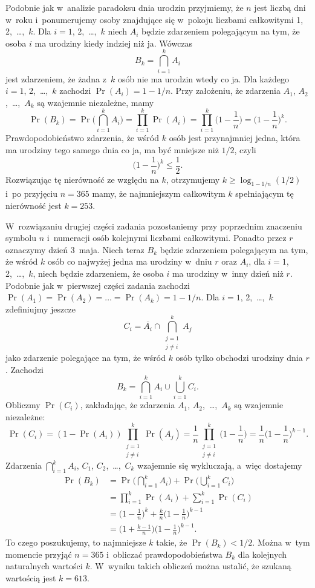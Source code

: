 
\exercise %
Podobnie jak w~analizie paradoksu dnia urodzin przyjmiemy, że $n$ jest liczbą dni w~roku i~ponumerujemy osoby znajdujące się w~pokoju liczbami całkowitymi 1, 2,~\dots,~$k$. Dla $i=1$, 2,~\dots,~$k$ niech $A_i$ będzie zdarzeniem polegającym na tym, że osoba $i$ ma urodziny kiedy indziej niż ja. Wówczas
\[
	B_k = \bigcap_{i=1}^kA_i
\]
jest zdarzeniem, że żadna z~$k$ osób nie ma urodzin wtedy co ja. Dla każdego $i=1$, 2,~\dots,~$k$ zachodzi $\Pr(A_i)=1-1/n$. Przy założeniu, że zdarzenia $A_1$, $A_2$,~\dots,~$A_k$ są wzajemnie niezależne, mamy
\[
	\Pr(B_k) = \Pr\biggl(\bigcap_{i=1}^kA_i\biggr) = \prod_{i=1}^k\Pr(A_i) = \prod_{i=1}^k\biggl(1-\frac{1}{n}\biggr) = \biggl(1-\frac{1}{n}\biggr)^k.
\]
Prawdopodobieństwo zdarzenia, że wśród $k$ osób jest przynajmniej jedna, która ma urodziny tego samego dnia co ja, ma być mniejsze niż $1/2$, czyli
\[
	\biggl(1-\frac{1}{n}\biggr)^k \le \frac{1}{2}.
\]
Rozwiązując tę nierówność ze względu na $k$, otrzymujemy $k\ge\log_{1-1/n}(1/2)$ i~po przyjęciu $n=365$ mamy, że najmniejszym całkowitym $k$ spełniającym tę nierówność jest $k=253$.

W~rozwiązaniu drugiej części zadania pozostaniemy przy poprzednim znaczeniu symbolu $n$ i~numeracji osób kolejnymi liczbami całkowitymi. Ponadto przez $r$ oznaczymy dzień 3~maja. Niech teraz $B_k$ będzie zdarzeniem polegającym na tym, że wśród $k$ osób co najwyżej jedna ma urodziny w~dniu $r$ oraz $A_i$, dla $i=1$, 2,~\dots,~$k$, niech będzie zdarzeniem, że osoba $i$ ma urodziny w~inny dzień niż $r$. Podobnie jak w~pierwszej części zadania zachodzi $\Pr(A_1)=\Pr(A_2)=\dots=\Pr(A_k)=1-1/n$. Dla $i=1$, 2,~\dots,~$k$ zdefiniujmy jeszcze
\[
	C_i = \overline{A_i}\cap\bigcap_{\substack{j=1\\j\ne i}}^kA_j
\]
jako zdarzenie polegające na tym, że wśród $k$ osób tylko  obchodzi urodziny dnia $r$. Zachodzi
\[
	B_k = \bigcap_{i=1}^kA_i\cup\bigcup_{i=1}^kC_i.
\]
Obliczmy $\Pr(C_i)$, zakładając, że zdarzenia $A_1$, $A_2$,~\dots,~$A_k$ są wzajemnie niezależne:
\[
	\Pr(C_i) = (1-\Pr(A_i))\prod_{\substack{j=1\\j\ne i}}^k\Pr(A_j) = \frac{1}{n}\prod_{\substack{j=1\\j\ne i}}^k\biggl(1-\frac{1}{n}\biggr) = \frac{1}{n}\biggl(1-\frac{1}{n}\biggr)^{k-1}.
\]
Zdarzenia $\bigcap_{i=1}^kA_i$, $C_1$, $C_2$,~\dots,~$C_k$ wzajemnie się wykluczają, a~więc dostajemy
\begin{align*}
	\Pr(B_k) &= \Pr\biggl(\bigcap_{i=1}^kA_i\biggr)+\Pr\biggl(\bigcup_{i=1}^kC_i\biggr) \\
	&= \prod_{i=1}^k\Pr(A_i)+\sum_{i=1}^k\Pr(C_i) \\
	&= \biggl(1-\frac{1}{n}\biggr)^k+\frac{k}{n}\biggl(1-\frac{1}{n}\biggr)^{k-1} \\
	&= \biggl(1+\frac{k-1}{n}\biggr)\biggl(1-\frac{1}{n}\biggr)^{k-1}.
\end{align*}
To czego poszukujemy, to najmniejsze $k$ takie, że $\Pr(B_k)<1/2$. Można w~tym momencie przyjąć $n=365$ i~obliczać prawdopodobieństwa $B_k$ dla kolejnych naturalnych wartości $k$. W~wyniku takich obliczeń można ustalić, że szukaną wartością jest $k=613$.

